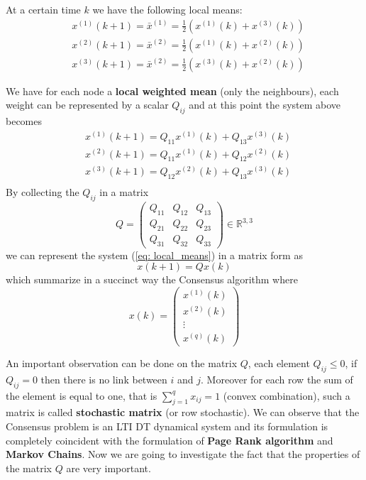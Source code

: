 At a certain time $k$ we have the following local means:
\begin{equation}    \label{eq: local_means}
    \begin{aligned}
        &x^{(1)}(k+1)=\bar{x}^{(1)} = \frac{1}{2} (x^{(1)}(k)+x^{(3)}(k))\\
        &x^{(2)}(k+1)=\bar{x}^{(2)} = \frac{1}{2} (x^{(1)}(k)+x^{(2)}(k))\\
        &x^{(3)}(k+1)=\bar{x}^{(2)} = \frac{1}{2} (x^{(3)}(k)+x^{(2)}(k))
    \end{aligned}
\end{equation}

\noindent
We have for each node a \textbf{local weighted mean} (only the neighbours), each weight can be represented by a scalar $Q_{ij}$ and at this point the system above becomes
\begin{equation}
    \begin{aligned}
        &x^{(1)}(k+1)= Q_{11} x^{(1)}(k)+Q_{13}x^{(3)}(k)\\
        &x^{(2)}(k+1)= Q_{11} x^{(1)}(k)+Q_{12}x^{(2)}(k)\\
        &x^{(3)}(k+1)= Q_{12} x^{(2)}(k)+Q_{13}x^{(3)}(k)\\
    \end{aligned}
\end{equation}
By collecting the $Q_{ij}$ in a matrix 
$$Q=\begin{pmatrix}
    Q_{11}&Q_{12}&Q_{13}\\
    Q_{21}&Q_{22}&Q_{23}\\
    Q_{31}&Q_{32}&Q_{33}
\end{pmatrix}
    \in\mathbb{R}^{3,3}$$
we can represent the system (\ref{eq: local_means}) in a matrix form as
\begin{equation}
    x(k+1)=Qx(k)
\end{equation}
which summarize in a succinct way the Consensus algorithm where
$$x(k)=\begin{pmatrix} x^{(1)}(k)\\x^{(2)}(k)\\\vdots\\x^{(q)}(k) \end{pmatrix}$$ 

An important observation can be done on the matrix $Q$, each element $Q_{ij}\le 0$, if $Q_{ij}=0$ then there is no link between $i$ and $j$. Moreover for each row the sum of the element is equal to one, that is $\sum_{j=1}^q x_{ij}=1$ (convex combination), such a matrix is called \textbf{stochastic matrix} (or row stochastic). We can observe that the Consensus problem is an LTI DT dynamical system and its formulation is completely coincident with the formulation of \textbf{Page Rank algorithm} and \textbf{Markov Chains}. Now we are going to investigate the fact that the properties of the matrix $Q$ are very important.

